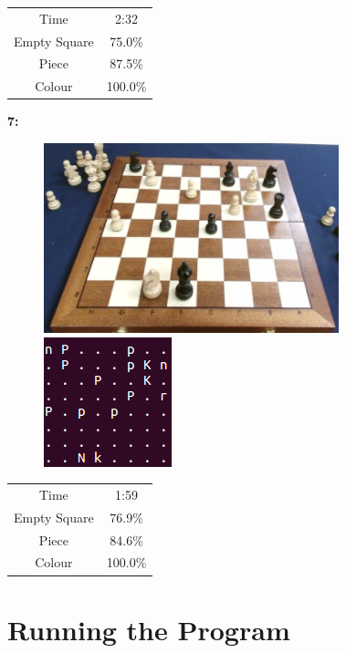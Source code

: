 \documentclass{l4proj}
\begin{document}
\begin{appendices}
\begin{table}[h!]
\centering
\begin{tabular}{|c|c|}
	\hline
	Time & 2:32 \\
	\rowcolor{brown!45}Empty Square & 75.0\%  \\
	Piece & 87.5\% \\
	\rowcolor{brown!45} Colour & 100.0\% \\
	\hline
\end{tabular}
\end{table}

\pagebreak
\textbf{7:}
\begin{figure}[h!]
\includegraphics[scale=0.8]{ts/ts12.png} \includegraphics[scale=0.75]{ts/tsd12.png}
\label{ts12}
\end{figure}

\begin{table}[h!]
\centering
\begin{tabular}{|c|c|}
	\hline
	Time & 1:59 \\
	\rowcolor{brown!45}Empty Square & 76.9\%  \\
	Piece & 84.6\% \\
	\rowcolor{brown!45} Colour & 100.0\% \\
	\hline
\end{tabular}
\end{table}

\chapter{Running the Program}


\end{appendices}
\end{document}

